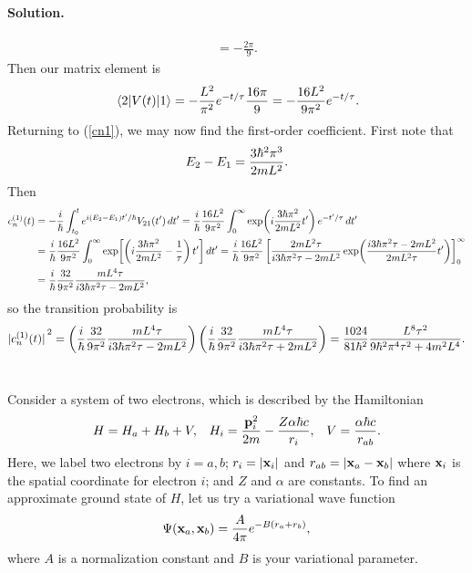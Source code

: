 \documentclass[11pt]{article}
\newcommand{\refeq}[1]{(\ref{#1})}
\newcommand{\beq}{\begin{equation*}}
\newcommand{\eeq}{\end{equation*}}
\newenvironment{statement}[1]
{
	\section{#1}
	\color{darkgray}
	\ignorespaces
}
{
}
\newenvironment{solution}
{
    \paragraph{Solution.}
    \ignorespaces
}
{
}
\begin{document}
\begin{solution}
\begin{align*}
		= -\frac{2\pi}{9}.
	\end{align*}
	Then our matrix element is
	\beq
		\mel{2}{\Vt}{1} = -\frac{L^2}{\pi^2} e^{-t / \tau} \frac{16 \pi}{9}
		= -\frac{16 L^2}{9 \pi^2} e^{-t / \tau}.
	\eeq
	 Returning to \refeq{cn1}, we may now find the first-order coefficient.  First note that
	 \beq
	 	\Ew - \Eq = \frac{3 \hbar^2 \pi^3}{2 m L^2}.
	 \eeq
	 Then
	 \begin{align*}
	 	c_n^{(1)}(t) &= -\frac{i}{\hbar} \int_{t_0}^t e^{i (E_2 - E_1) t' / \hbar} V_{2 1}(t') \dd{t'}
	 	= \frac{i}{\hbar} \frac{16 L^2}{9 \pi^2} \int_0^\infty \exp(i \frac{3 \hbar \pi^2}{2 m L^2} t')  \, e^{-t' / \tau} \dd{t'} \\
	 	&= \frac{i}{\hbar} \frac{16 L^2}{9 \pi^2} \int_0^\infty \exp[ \left( i \frac{3 \hbar \pi^2}{2 m L^2} - \frac{1}{\tau} \right) t'] \dd{t'}
	 	= \frac{i}{\hbar} \frac{16 L^2}{9 \pi^2} \left[ \frac{2 m L^2 \tau}{i 3 \hbar \pi^2 \tau - 2 m L^2} \exp(\frac{i 3 \hbar \pi^2 \tau - 2 m L^2}{2 m L^2 \tau} t') \right]_0^\infty \\
	 	&= \frac{i}{\hbar} \frac{32}{9 \pi^2} \frac{m L^4 \tau}{i 3 \hbar \pi^2 \tau - 2 m L^2},
	 \end{align*}
	 so the transition probability is
	 \beq
	 	\abs*{\cnqt}^2 = \left( \frac{i}{\hbar} \frac{32}{9 \pi^2} \frac{m L^4 \tau}{i 3 \hbar \pi^2 \tau - 2 m L^2} \right) \left( \frac{i}{\hbar} \frac{32}{9 \pi^2} \frac{m L^4 \tau}{i 3 \hbar \pi^2 \tau + 2 m L^2} \right)
	 	= \frac{1024}{81 \hbar^2} \frac{L^8 \tau^2}{9 \hbar^2 \pi^4 \tau^2 + 4 m^2 L^4}.
	 \eeq
\end{solution}



\newcommand{\Ha}{H_a}
\newcommand{\Hb}{H_b}
\newcommand{\Hi}{H_i}
\newcommand{\vp}{\vb{p}}
\newcommand{\vpi}{\vp_i}
\newcommand{\alp}{\alpha}
\newcommand{\ri}{r_i}
\newcommand{\ra}{r_a}
\newcommand{\rb}{r_b}
\newcommand{\rab}{r_{a b}}
\newcommand{\vx}{\vb{x}}
\newcommand{\vxi}{\vx_i}
\newcommand{\vxa}{\vx_a}
\newcommand{\vxb}{\vx_b}

\begin{statement}{}
	Consider a system of two electrons, which is described by the Hamiltonian
	\begin{align*}
		H &= \Ha + \Hb + V, &
		\Hi &= \frac{\vpi^2}{2m} - \frac{Z \alp \hbar c}{\ri}, &
		V = \frac{\alp \hbar c}{\rab}.
	\end{align*}
	Here, we label two electrons by $i = a, b$; $\ri = \abs{\vxi}$ and $\rab = \abs{\vxa - \vxb}$ where $\vxi$ is the spatial coordinate for electron $i$; and $Z$ and $\alp$ are constants.  To find an approximate ground state of $H$, let us try a variational wave function
	\beq
		\Psi(\vxa, \vxb) = \frac{A}{4\pi} e^{-B(\ra + \rb)},
	\eeq
	where $A$ is a normalization constant and $B$ is your variational parameter.
\end{statement}
\end{document}
